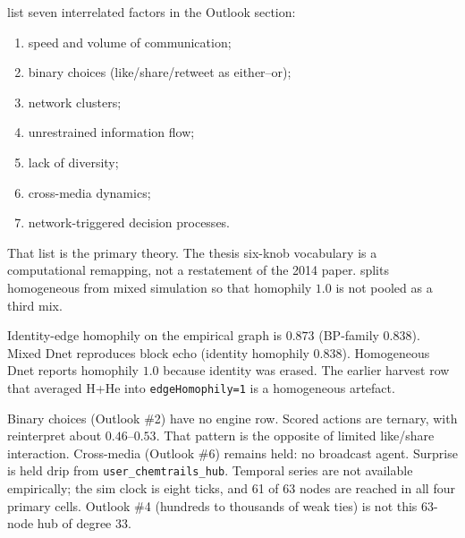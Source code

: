 \textcite{pfeffer2014firestorms} list seven interrelated factors in the Outlook section:
\begin{enumerate}[nosep]
\item speed and volume of communication;
\item binary choices (like/share/retweet as either--or);
\item network clusters;
\item unrestrained information flow;
\item lack of diversity;
\item cross-media dynamics;
\item network-triggered decision processes.
\end{enumerate}
That list is the primary theory.
The thesis six-knob vocabulary is a computational remapping, not a restatement of the 2014 paper.
 splits homogeneous from mixed simulation so that homophily $1.0$ is not pooled as a third mix.

Identity-edge homophily on the empirical graph is $0.873$ (BP-family $0.838$).
Mixed Dnet reproduces block echo (identity homophily $0.838$).
Homogeneous Dnet reports homophily $1.0$ because identity was erased.
The earlier harvest row that averaged H+He into \texttt{edgeHomophily=1} is a homogeneous artefact.

Binary choices (Outlook \#2) have no engine row.
Scored actions are ternary, with reinterpret about $0.46$--$0.53$.
That pattern is the opposite of limited like/share interaction.
Cross-media (Outlook \#6) remains held: no broadcast agent.
Surprise is held drip from \texttt{user\_chemtrails\_hub}.
Temporal series are not available empirically; the sim clock is eight ticks, and 61 of 63 nodes are reached in all four primary cells.
Outlook \#4 (hundreds to thousands of weak ties) is not this 63-node hub of degree 33.

